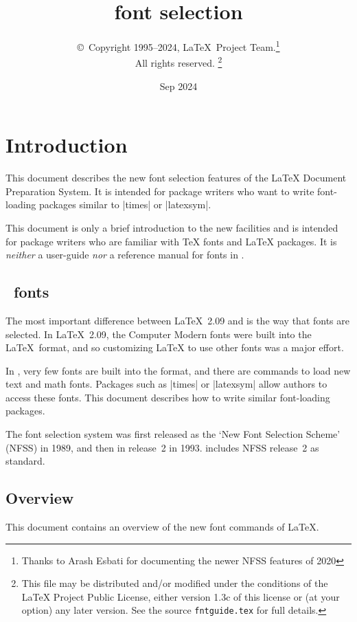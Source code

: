 \documentclass{ltxguide}[1995/11/28]
\title{\LaTeXe{} font selection}
\author{\copyright~Copyright 1995--2024, \LaTeX\ Project
  Team.\thanks{Thanks to Arash Esbati for documenting the
    newer NFSS features of 2020}\\
  All rights reserved.%
  \footnote{This file may be distributed and/or modified under the
    conditions of the \LaTeX{} Project Public License, either version 1.3c
    of this license or (at your option) any later version. See the source
   \texttt{fntguide.tex} for full details.}%
}
\date{Sep 2024}
\begin{document}
\maketitle

\tableofcontents

\section{Introduction}

This document describes the new font selection features of the \LaTeX{}
Document Preparation System.  It is intended for package writers who
want to write font-loading packages similar to |times| or |latexsym|.

This document is only a brief introduction to the new facilities and is
intended for package writers who are familiar with \TeX{} fonts and
\LaTeX{} packages.  It is \emph{neither} a user-guide \emph{nor} a
reference manual for fonts in \LaTeXe.

\subsection{\LaTeXe~fonts}

The most important difference between \LaTeX~2.09 and \LaTeXe{} is the
way that fonts are selected.  In \LaTeX~2.09, the Computer Modern fonts
were built into the \LaTeX~format, and so customizing \LaTeX{} to use
other fonts was a major effort.

In \LaTeXe, very few fonts are built into the format, and there are
commands to load new text and math fonts.  Packages such as |times| or
|latexsym| allow authors to access these fonts.  This document describes
how to write similar font-loading packages.

The \LaTeXe{} font selection system was first released as the `New Font
Selection Scheme' (NFSS) in 1989, and then in release~2 in 1993.
\LaTeXe{} includes NFSS release~2 as standard.

\subsection{Overview}

This document contains an overview of the new font commands of \LaTeX.
\end{document}
